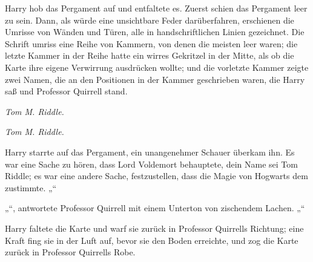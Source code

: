 Harry hob das Pergament auf und entfaltete es.
%
Zuerst schien das Pergament leer zu sein. Dann, als würde eine unsichtbare Feder darüberfahren, erschienen die Umrisse von Wänden und Türen, alle in handschriftlichen Linien gezeichnet. Die Schrift umriss eine Reihe von Kammern, von denen die meisten leer waren; die letzte Kammer in der Reihe hatte ein wirres Gekritzel in der Mitte, als ob die Karte ihre eigene Verwirrung ausdrücken wollte; und die vorletzte Kammer zeigte zwei Namen, die an den Positionen in der Kammer geschrieben waren, die Harry saß und Professor Quirrell stand.

\emph{Tom M. Riddle.}

\emph{Tom M. Riddle.}

Harry starrte auf das Pergament, ein unangenehmer Schauer überkam ihn. Es war eine Sache zu hören, dass Lord Voldemort behauptete, dein Name sei Tom Riddle; es war eine andere Sache, festzustellen, dass die Magie von Hogwarts dem zustimmte.
„“

„“, antwortete Professor Quirrell mit einem Unterton von zischendem Lachen. „“

Harry faltete die Karte und warf sie zurück in Professor Quirrells Richtung; eine Kraft fing sie in der Luft auf, bevor sie den Boden erreichte, und zog die Karte zurück in Professor Quirrells Robe.

